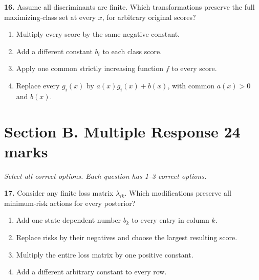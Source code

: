 \documentclass[11pt,a4paper]{article}
\begin{document}
\par\noindent\begin{minipage}{\linewidth}
\textbf{16.} Assume all discriminants are finite. Which transformations preserve the full maximizing-class set at every \(x\), for arbitrary original scores?
\begin{enumerate}[label=(\Alph*),leftmargin=8mm,itemsep=2pt,topsep=2pt]
\item Multiply every score by the same negative constant.
\item Add a different constant \(b_i\) to each class score.
\item Apply one common strictly increasing function \(f\) to every score.
\item Replace every \(g_i(x)\) by \(a(x)g_i(x)+b(x)\), with common \(a(x)>0\) and \(b(x)\).
\end{enumerate}

\end{minipage}\par\vspace{3mm}
\newpage\section*{Section B. Multiple Response \hfill 24 marks}
\textit{Select all correct options. Each question has 1--3 correct options.}\par
\par\noindent\begin{minipage}{\linewidth}
\textbf{17.} Consider any finite loss matrix \(\lambda_{ik}\). Which modifications preserve all minimum-risk actions for every posterior?
\begin{enumerate}[label=(\Alph*),leftmargin=8mm,itemsep=2pt,topsep=2pt]
\item Add one state-dependent number \(b_k\) to every entry in column \(k\).
\item Replace risks by their negatives and choose the largest resulting score.
\item Multiply the entire loss matrix by one positive constant.
\item Add a different arbitrary constant to every row.
\end{enumerate}

\end{minipage}\par\vspace{3mm}
\end{document}
